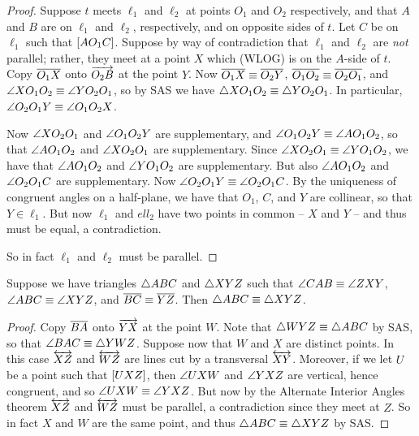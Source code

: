 \begin{proof}
Suppose \(t\) meets \(\ell_1\) and \(\ell_2\) at points \(O_1\) and \(O_2\) respectively, and that \(A\) and \(B\) are on \(\ell_1\) and \(\ell_2\), respectively, and on opposite sides of \(t\).
Let \(C\) be on \(\ell_1\) such that \([ A O_1 C ]\).
Suppose by way of contradiction that \(\ell_1\) and \(\ell_2\) are \emph{not} parallel; rather, they meet at a point \(X\) which (WLOG) is on the \(A\)-side of \(t\).
Copy \(\overline{O_1X}\) onto \(\overrightarrow{O_2B}\) at the point \(Y\).
Now \(\overline{O_1X} \equiv \overline{O_2Y}\), \(\overline{O_1O_2} \equiv \overline{O_2O_1}\), and \(\angle{XO_1O_2} \equiv \angle{YO_2O_1}\), so by SAS we have \(\bigtriangleup{XO_1O_2} \equiv \bigtriangleup{YO_2O_1}\).
In particular, \(\angle{O_2O_1Y} \equiv \angle{O_1O_2X}\).

Now \(\angle{XO_2O_1}\) and \(\angle{O_1O_2Y}\) are supplementary, and \(\angle{O_1O_2Y} \equiv \angle{AO_1O_2}\), so that \(\angle{AO_1O_2}\) and \(\angle{XO_2O_1}\) are supplementary.
Since \(\angle{XO_2O_1} \equiv \angle{YO_1O_2}\), we have that \(\angle{AO_1O_2}\) and \(\angle{YO_1O_2}\) are supplementary.
But also \(\angle{AO_1O_2}\) and \(\angle{O_2O_1C}\) are supplementary.
Now \(\angle{O_2O_1Y} \equiv \angle{O_2O_1C}\).
By the uniqueness of congruent angles on a half-plane, we have that \(O_1\), \(C\), and \(Y\) are collinear, so that \(Y \in \ell_1\).
But now \(\ell_1\) and \(ell_2\) have two points in common -- \(X\) and \(Y\) -- and thus must be equal, a contradiction.

So in fact \(\ell_1\) and \(\ell_2\) must be parallel. 
\end{proof}

\begin{prop}[AAS]
Suppose we have triangles \(\bigtriangleup{ABC}\) and \(\bigtriangleup{XYZ}\) such that \(\angle{CAB} \equiv \angle{ZXY}\), \(\angle{ABC} \equiv \angle{XYZ}\), and \(\overline{BC} \equiv \overline{YZ}\).
Then \(\bigtriangleup{ABC} \equiv \bigtriangleup{XYZ}\).
\end{prop}

\begin{proof}
Copy \(\overline{BA}\) onto \(\overrightarrow{YX}\) at the point \(W\).
Note that \(\bigtriangleup{WYZ} \equiv \bigtriangleup{ABC}\) by SAS, so that \(\angle{BAC} \equiv \bigtriangleup{YWZ}\).
Suppose now that \(W\) and \(X\) are distinct points.
In this case \(\overleftrightarrow{XZ}\) and \(\overleftrightarrow{WZ}\) are lines cut by a transversal \(\overleftrightarrow{XY}\).
Moreover, if we let \(U\) be a point such that \([ U X Z ]\), then \(\angle{UXW}\) and \(\angle{YXZ}\) are vertical, hence congruent, and so \(\angle{UXW} \equiv \angle{YXZ}\).
But now by the Alternate Interior Angles theorem \(\overleftrightarrow{XZ}\) and \(\overleftrightarrow{WZ}\) must be parallel, a contradiction since they meet at \(Z\).
So in fact \(X\) and \(W\) are the same point, and thus \(\bigtriangleup{ABC} \equiv \bigtriangleup{XYZ}\) by SAS.
\end{proof}

